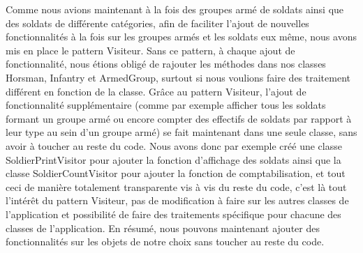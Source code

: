 Comme nous avions maintenant à la fois des groupes armé de soldats ainsi que des soldats de différente catégories, afin de faciliter l'ajout de nouvelles fonctionnalités à la fois sur les groupes armés et les soldats eux même, nous avons mis en place le pattern Visiteur. Sans ce pattern, à chaque ajout de fonctionnalité, nous étions obligé de rajouter les méthodes dans nos classes Horsman, Infantry et ArmedGroup, surtout si nous voulions faire des traitement différent en fonction de la classe. Grâce au pattern Visiteur, l'ajout de fonctionnalité supplémentaire (comme par exemple afficher tous les soldats formant un groupe armé ou encore compter des effectifs de soldats par rapport à leur type au sein d’un groupe armé) se fait maintenant dans une seule classe, sans avoir à toucher au reste du code. Nous avons donc par exemple créé une classe SoldierPrintVisitor pour ajouter la fonction d'affichage des soldats ainsi que la classe SoldierCountVisitor pour ajouter la fonction de comptabilisation, et tout ceci de manière totalement transparente vis à vis du reste du code, c'est là tout l’intérêt du pattern Visiteur, pas de modification à faire sur les autres classes de l'application et possibilité de faire des traitements spécifique pour chacune des classes de l'application. En résumé, nous pouvons maintenant ajouter des fonctionnalités sur les objets de notre choix sans toucher au reste du code.




